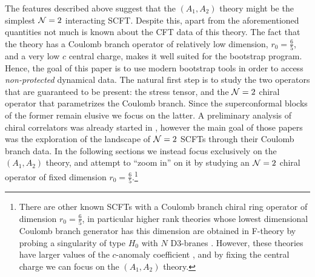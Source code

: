 The features described above suggest that the $(A_1,A_2)$ theory might be the simplest ${\mathcal{N}}=2$ interacting SCFT. Despite this, apart from the aforementioned quantities not much is known about the CFT data of this theory.
The fact that the theory has a Coulomb branch operator of relatively low dimension, $r_0=\frac65$, and a very low $c$ central charge, makes it well suited for the bootstrap program. 
Hence, the goal of this paper is to use modern bootstrap tools in order to access \emph{non-protected} dynamical data. 
The natural first step
is to study the two operators that are guaranteed to be present:
the stress tensor, and the ${\mathcal{N}}=2$ chiral operator that parametrizes the Coulomb branch. Since the superconformal blocks of the former remain elusive we focus on the latter.
A preliminary analysis of chiral correlators was already started in \cite{Beem:2014zpa,Lemos:2015awa}, however the main goal of those papers was the exploration of the landscape of ${\mathcal{N}}=2$ SCFTs through their Coulomb branch data. 
In the following sections we instead focus exclusively on the $(A_1,A_2)$ theory, and attempt to ``zoom in'' on it by studying an ${\mathcal{N}}=2$ chiral operator of fixed dimension $r_0=\frac65$.\footnote{There are other known SCFTs with a Coulomb branch chiral ring operator of dimension $r_0=\frac65$, in particular higher rank theories whose lowest dimensional Coulomb branch generator has this dimension are obtained in F-theory by probing a singularity of type $H_0$ with $N$ D3-branes \cite{Dasgupta:1996ij,Aharony:1998xz}. However, these theories have larger values of the $c$-anomaly coefficient \cite{Aharony:2016kai}, and by fixing the central charge we can focus on the $(A_1,A_2)$ theory.}




